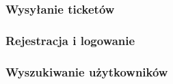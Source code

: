 \documentclass{article}
\begin{document}
\subsubsection{Wysyłanie ticketów}
\subsubsection{Rejestracja i logowanie}
\subsubsection{Wyszukiwanie użytkowników}
\end{document}
